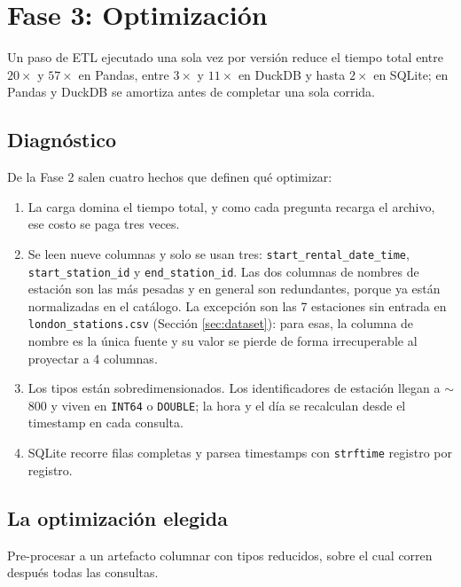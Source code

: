 \section{Fase 3: Optimización}

Un paso de ETL ejecutado una sola vez por versión reduce el tiempo total entre $20\times$ y $57\times$ en Pandas, entre $3\times$ y $11\times$ en DuckDB y hasta $2\times$ en SQLite; en Pandas y DuckDB se amortiza antes de completar una sola corrida.

\subsection{Diagnóstico}
\label{sec:fase3-diagnostico}

De la Fase 2 salen cuatro hechos que definen qué optimizar:

\begin{enumerate}
  \item La carga domina el tiempo total, y como cada pregunta recarga el archivo, ese costo se paga tres veces.
  \item Se leen nueve columnas y solo se usan tres: \texttt{start\_rental\_date\_time}, \texttt{start\_station\_id} y \texttt{end\_station\_id}. Las dos columnas de nombres de estación son las más pesadas y en general son redundantes, porque ya están normalizadas en el catálogo. La excepción son las 7 estaciones sin entrada en \texttt{london\_stations.csv} (Sección \ref{sec:dataset}): para esas, la columna de nombre es la única fuente y su valor se pierde de forma irrecuperable al proyectar a 4 columnas.
  \item Los tipos están sobredimensionados. Los identificadores de estación llegan a $\sim$800 y viven en \texttt{INT64} o \texttt{DOUBLE}; la hora y el día se recalculan desde el timestamp en cada consulta.
  \item SQLite recorre filas completas y parsea timestamps con \texttt{strftime} registro por registro.
\end{enumerate}

\subsection{La optimización elegida}

Pre-procesar a un artefacto columnar con tipos reducidos, sobre el cual corren después todas las consultas.

